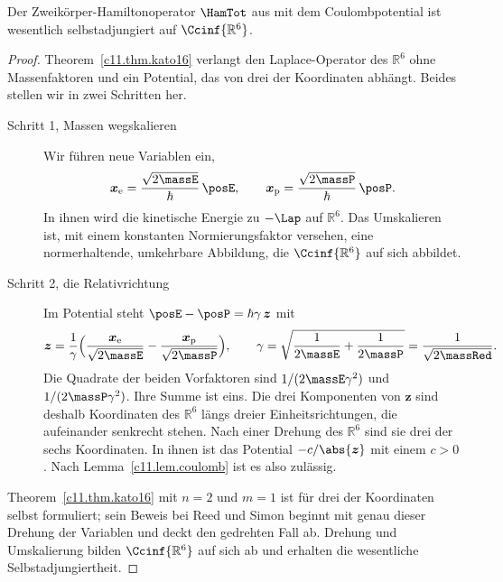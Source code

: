 \begin{fundament}
  \begin{proposition}\label{c11.prop.zweikoerper}
    Der Zweikörper-Hamiltonoperator $\HamTot$ aus  mit dem Coulombpotential
    ist wesentlich selbstadjungiert auf $\Ccinf{\mathbb{R}^6}$.
  \end{proposition}
  \begin{proof}
    Theorem~\ref{c11.thm.kato16} verlangt den Laplace-Operator des $\mathbb{R}^6$ ohne
    Massenfaktoren und ein Potential, das von drei der Koordinaten abhängt. Beides
    stellen wir in zwei Schritten her.
    \begin{description}
      \item[Schritt 1, Massen wegskalieren] Wir führen neue Variablen ein,
        \begin{equation*}
          \boldsymbol{x}_{\mathrm{e}} = \frac{\sqrt{2\massE}}{\hbar}\,\posE,
          \qquad
          \boldsymbol{x}_{\mathrm{p}} = \frac{\sqrt{2\massP}}{\hbar}\,\posP .
        \end{equation*}
        In ihnen wird die kinetische Energie zu $-\Lap$ auf $\mathbb{R}^6$. Das Umskalieren ist, mit einem konstanten
        Normierungsfaktor versehen, eine normerhaltende, umkehrbare Abbildung, die
        $\Ccinf{\mathbb{R}^6}$ auf sich abbildet.
      \item[Schritt 2, die Relativrichtung] Im Potential steht
        $\posE - \posP = \hbar\gamma\,\boldsymbol{z}$ mit
        \begin{equation}\label{c11.eq.drehung}
          \boldsymbol{z} = \frac{1}{\gamma}\Bigl(
            \frac{\boldsymbol{x}_{\mathrm{e}}}{\sqrt{2\massE}}
            - \frac{\boldsymbol{x}_{\mathrm{p}}}{\sqrt{2\massP}}\Bigr),
          \qquad
          \gamma = \sqrt{\frac{1}{2\massE} + \frac{1}{2\massP}}
                 = \frac{1}{\sqrt{2\massRed}} .
        \end{equation}
        Die Quadrate der beiden Vorfaktoren sind $1/(2\massE\gamma^2)$ und
        $1/(2\massP\gamma^2)$. Ihre Summe ist eins. Die drei Komponenten von
        $\boldsymbol{z}$ sind deshalb Koordinaten des $\mathbb{R}^6$ längs dreier
        Einheitsrichtungen, die aufeinander senkrecht stehen. Nach einer Drehung des
        $\mathbb{R}^6$ sind sie drei der sechs Koordinaten. In ihnen ist das Potential
        $-c/\abs{\boldsymbol{z}}$ mit einem $c > 0$. Nach Lemma~\ref{c11.lem.coulomb}
        ist es also zulässig.
    \end{description}
    Theorem~\ref{c11.thm.kato16} mit $n = 2$ und $m = 1$ ist für drei der Koordinaten
    selbst formuliert; sein Beweis bei Reed und Simon beginnt mit genau dieser Drehung
    der Variablen und deckt den gedrehten Fall ab. Drehung und Umskalierung bilden
    $\Ccinf{\mathbb{R}^6}$ auf sich ab und erhalten die wesentliche Selbstadjungiertheit.
  \end{proof}


\end{fundament}
